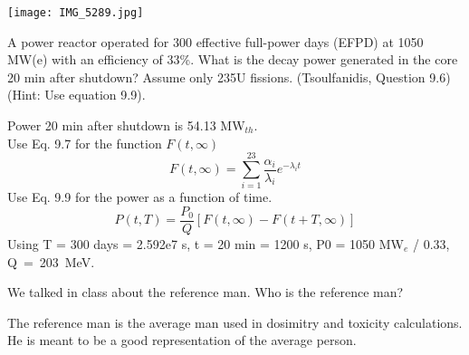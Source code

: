 \documentclass[11pt,answers,addpoints]{exam}
\begin{document}
\begin{questions}
\begin{parts}
\begin{solution}
                \texttt{[image: IMG\_5289.jpg]}
        \end{solution}
        \end{parts}
        \question[15] A power reactor operated for 300 effective full-power days 
        (EFPD) at 1050 MW(e) with an efficiency of 33\%. What is the decay 
        power generated in the core 20 min after shutdown? Assume only 235U 
        fissions. (Tsoulfanidis, Question 9.6) (Hint: Use equation 9.9).
        \begin{solution}
                Power 20 min after shutdown is 54.13 MW$_{th}$. \\

                Use Eq. 9.7 for the function $F(t, \infty)$
                \begin{equation}
                    F(t, \infty) = \sum_{i=1}^{23} \frac{\alpha_i}{\lambda_i} e^{-\lambda_i t} 
                \end{equation}
                Use Eq. 9.9 for the power as a function of time.
                \begin{equation}
                    P(t, T) = \frac{P_0}{Q} \left[ F(t, \infty) - F(t + T, \infty) \right]
                \end{equation}
                Using T = 300 days = 2.592e7 s, t = 20 min = 1200 s, P0 = 1050 MW$_{e}$ / 0.33, Q~=~203~MeV.
        \end{solution}
        \question[5] We talked in class about the reference man. Who is the 
        reference man?
        \begin{solution}
                The reference man is the average man used in dosimitry and toxicity calculations. He is meant to be a good representation of the average person.
        \end{solution}

\end{questions}
\end{document}
